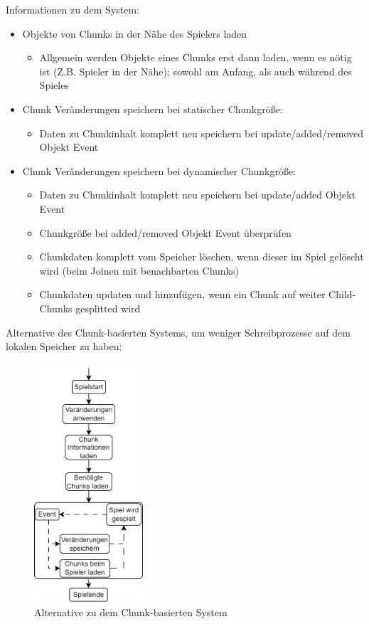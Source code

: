 Informationen zu dem System:

\begin{itemize}
    \item Objekte von Chunks in der Nähe des Spielers laden
    \begin{itemize}
        \item Allgemein werden Objekte eines Chunks erst dann laden, wenn es nötig ist (Z.B. Spieler in der Nähe); sowohl am Anfang, als auch während des Spieles
    \end{itemize}
    \item Chunk Veränderungen speichern bei statischer Chunkgröße:
    \begin{itemize}
        \item Daten zu Chunkinhalt komplett neu speichern bei update/added/removed Objekt Event
    \end{itemize}
    \item Chunk Veränderungen speichern bei dynamischer Chunkgröße:
    \begin{itemize}
        \item Daten zu Chunkinhalt komplett neu speichern bei update/added Objekt Event 
        \item Chunkgröße bei added/removed Objekt Event überprüfen
        \item Chunkdaten komplett vom Speicher löschen, wenn dieser im Spiel gelöscht wird (beim Joinen mit benachbarten Chunks)
        \item Chunkdaten updaten und hinzufügen, wenn ein Chunk auf weiter Child-Chunks gesplitted wird
    \end{itemize}
\end{itemize}

Alternative des Chunk-basierten Systems, um weniger Schreibprozesse auf dem lokalen Speicher zu haben:

\begin{figure}[htp]
    \centering
    \includegraphics[width=0.36\textwidth]{images/Chunkbasiert2.png}
    \caption{Alternative zu dem Chunk-basierten System}
    \label{fig:altchunkBasedSystem}
\end{figure}

